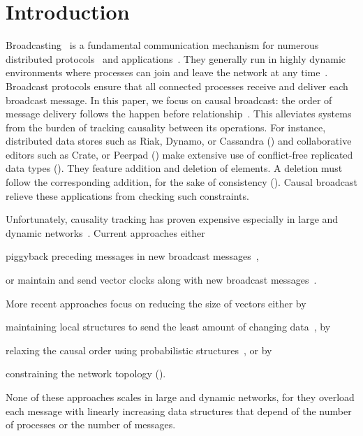 
\section{Introduction}


Broadcasting~\cite{hadzilacos1994modular} is a fundamental communication
mechanism for numerous distributed
protocols~\cite{nakamoto2009bitcoin,shapiro2011comprehensive} and
applications~\cite{nedelec2016crate}. They generally run in highly dynamic
environments where processes can join and leave the network at any
time~\cite{mostefaoui2005static}. Broadcast protocols ensure that all connected
processes receive and deliver each broadcast message.
In this paper, we focus on causal broadcast: the order of message delivery
follows the happen before
relationship~\cite{lamport1978time,schwarz1994detecting}. This alleviates
systems from the burden of tracking causality between its operations.  For
instance, distributed data stores such as Riak, Dynamo, or Cassandra (\REF) and
collaborative editors such as Crate, or Peerpad (\REF) make extensive use of
conflict-free replicated data types (\REF). They feature addition and deletion
of elements. A deletion must follow the corresponding addition, for the sake of
consistency (\REF). Causal broadcast relieve these applications from checking
such constraints.

Unfortunately, causality tracking has proven expensive especially in large and
dynamic networks~\cite{charronbost1991concerning}. Current approaches either
\begin{inparaenum}[(i)]
\item piggyback preceding messages in new broadcast
  messages~\cite{birman1987reliable,hadzilacos1993fault},
\item or maintain and send vector clocks along with new broadcast
  messages~\cite{fidge1988timestamps,mattern1989virtual}.
\end{inparaenum}
More recent approaches focus on reducing the size of vectors either by
\begin{inparaenum}[(a)]
\item maintaining local structures to send the least amount of changing
  data~\cite{singhal1992efficient}, by
\item relaxing the causal order using probabilistic
  structures~\cite{mostefaoui2017probabilistic}, or by
\item constraining the network topology (\REF).
\end{inparaenum}
None of these approaches scales in large and dynamic networks, for they overload
each message with linearly increasing data structures that depend of the number
of processes or the number of messages.


